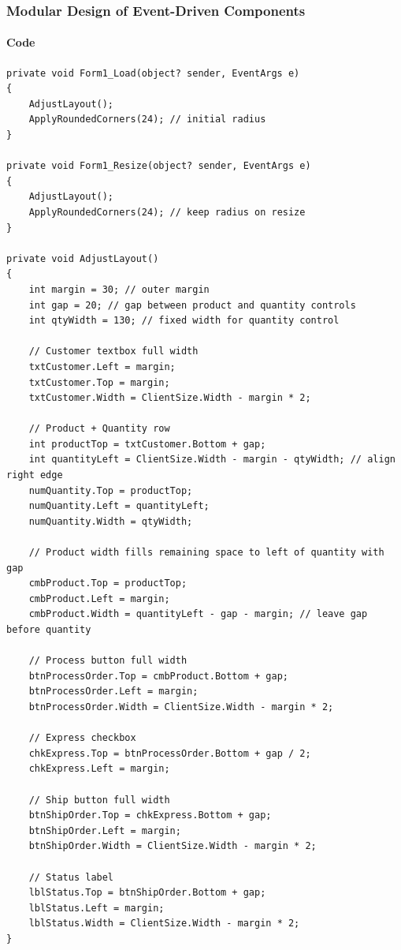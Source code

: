 \subsubsection{Modular Design of Event-Driven Components}

\paragraph{Code}

\begin{lstlisting}[language=CSharp, caption={Complete UI Layout and Enhancement Implementation}]
private void Form1_Load(object? sender, EventArgs e)
{
    AdjustLayout();
    ApplyRoundedCorners(24); // initial radius
}

private void Form1_Resize(object? sender, EventArgs e)
{
    AdjustLayout();
    ApplyRoundedCorners(24); // keep radius on resize
}

private void AdjustLayout()
{
    int margin = 30; // outer margin
    int gap = 20; // gap between product and quantity controls
    int qtyWidth = 130; // fixed width for quantity control
    
    // Customer textbox full width
    txtCustomer.Left = margin;
    txtCustomer.Top = margin;
    txtCustomer.Width = ClientSize.Width - margin * 2;
    
    // Product + Quantity row
    int productTop = txtCustomer.Bottom + gap;
    int quantityLeft = ClientSize.Width - margin - qtyWidth; // align right edge
    numQuantity.Top = productTop;
    numQuantity.Left = quantityLeft;
    numQuantity.Width = qtyWidth;
    
    // Product width fills remaining space to left of quantity with gap
    cmbProduct.Top = productTop;
    cmbProduct.Left = margin;
    cmbProduct.Width = quantityLeft - gap - margin; // leave gap before quantity
    
    // Process button full width
    btnProcessOrder.Top = cmbProduct.Bottom + gap;
    btnProcessOrder.Left = margin;
    btnProcessOrder.Width = ClientSize.Width - margin * 2;
    
    // Express checkbox
    chkExpress.Top = btnProcessOrder.Bottom + gap / 2;
    chkExpress.Left = margin;
    
    // Ship button full width
    btnShipOrder.Top = chkExpress.Bottom + gap;
    btnShipOrder.Left = margin;
    btnShipOrder.Width = ClientSize.Width - margin * 2;
    
    // Status label
    lblStatus.Top = btnShipOrder.Bottom + gap;
    lblStatus.Left = margin;
    lblStatus.Width = ClientSize.Width - margin * 2;
}


\end{lstlisting}
